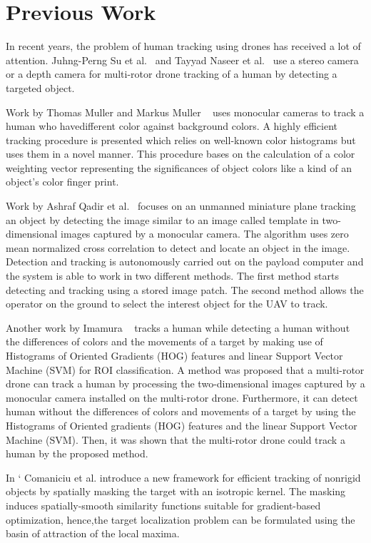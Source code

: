 \chapter{Previous Work}

In recent years, the problem of human tracking using drones has received a lot of attention. Juhng-Perng Su et al.~\cite{su2013height} and Tayyad Naseer et al.~\cite{naseer2013followme} use a stereo camera or a depth camera for multi-rotor drone tracking of a human by detecting a targeted object. 

Work by Thomas Muller and Markus Muller ~\cite{muller2011vision} uses monocular cameras to track a human who havedifferent color against background colors. A highly efficient tracking procedure is presented which relies on well-known color histograms but uses them in a novel manner. This procedure bases on the calculation of a color weighting vector representing the significances of object colors like a kind of an object’s color finger print.

Work by Ashraf Qadir et al.~\cite{qadir2011board} focuses on an unmanned miniature plane tracking an object by detecting the image similar to an image called template in two-dimensional images captured by a monocular camera. The algorithm uses zero mean normalized cross correlation to detect and locate an object in the image. Detection and tracking is autonomously carried out on the payload computer and the system is able to work in two different methods. The first method starts detecting and tracking using a stored image patch. The second method allows the operator on the ground to select the interest object for the UAV to track.

Another work by Imamura ~\cite{imamura2016human} tracks a human while detecting a human without the differences of colors and the movements of a target by making use of Histograms of Oriented Gradients (HOG) features and linear Support Vector Machine (SVM) for ROI classification. A method was proposed that  a  multi-rotor  drone  can  track  a  human by processing  the two-dimensional images captured by a   monocular camera installed  on  the  multi-rotor  drone. Furthermore, it can detect human  without  the  differences  of  colors  and  movements  of  a 
target  by  using  the  Histograms  of  Oriented  gradients  (HOG) 
features and the linear Support Vector Machine (SVM). Then, it was shown that  the multi-rotor drone could track a human by the proposed method.

In `\cite{comaniciu2003kernel} Comaniciu et al. introduce a new framework for
efficient tracking of nonrigid objects by spatially masking the target with an isotropic kernel. The masking induces spatially-smooth similarity functions suitable for gradient-based optimization, hence,the target localization problem
can be formulated using the basin of attraction of the local maxima.

